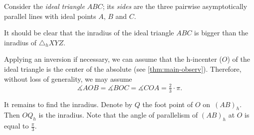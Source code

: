 Consider the \emph{ideal triangle} $ABC$;
its \emph{sides} are the three pairwise asymptotically parallel lines with ideal points $A$, $B$ and $C$.

It should be clear that the inradius of the ideal triangle $ABC$
is bigger than the inradius of $\triangle_hXYZ$.


Applying an inversion if necessary,
we can assume that the h-incenter ($O$)
of the ideal triangle is the center of the absolute (see \ref{thm:main-observ}). 
Therefore, without loss of generality, we may assume 
$$\measuredangle AOB=\measuredangle BOC=\measuredangle COA=\tfrac23\cdot\pi.$$

It remains to find the inradius.
Denote by $Q$ the foot point of $O$ on~$(AB)_h$.
Then $OQ_h$ is the inradius.
Note that the angle of parallelism of $(AB)_h$ at $O$ is equal to $\tfrac\pi3$.

